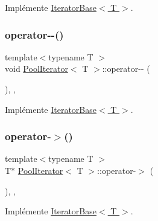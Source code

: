 Implémente \hyperlink{class_iterator_base_a816f35e9020716d212124a34f1c033fb}{Iterator\+Base$<$ T $>$}.

\mbox{\label{class_pool_iterator_aa1f588a47b0c11d6e064e34b129337ae}} 
\subsubsection{\texorpdfstring{operator-\/-\/()}{operator--()}}
{\footnotesize\ttfamily template$<$typename T $>$ \\
void \hyperlink{class_pool_iterator}{Pool\+Iterator}$<$ T $>$\+::operator-\/-\/ (\begin{DoxyParamCaption}{ }\end{DoxyParamCaption})\hspace{0.3cm}{\ttfamily [inline]}, {\ttfamily [override]}, {\ttfamily [virtual]}}



Implémente \hyperlink{class_iterator_base_aa9bf0f75a8bb7e4d416a9b88ccacd9c7}{Iterator\+Base$<$ T $>$}.

\mbox{\label{class_pool_iterator_ae2893041831d8c29f222af7fe184fe09}} 
\subsubsection{\texorpdfstring{operator-\/$>$()}{operator->()}\hspace{0.1cm}{\footnotesize\ttfamily [1/2]}}
{\footnotesize\ttfamily template$<$typename T $>$ \\
T$\ast$ \hyperlink{class_pool_iterator}{Pool\+Iterator}$<$ T $>$\+::operator-\/$>$ (\begin{DoxyParamCaption}{ }\end{DoxyParamCaption})\hspace{0.3cm}{\ttfamily [inline]}, {\ttfamily [override]}, {\ttfamily [virtual]}}



Implémente \hyperlink{class_iterator_base_aad2254f7877e4647f699ceb455e893ff}{Iterator\+Base$<$ T $>$}.

\mbox{\label{class_pool_iterator_a228d6ee24cd015a7312fa9f76244994c}} 

